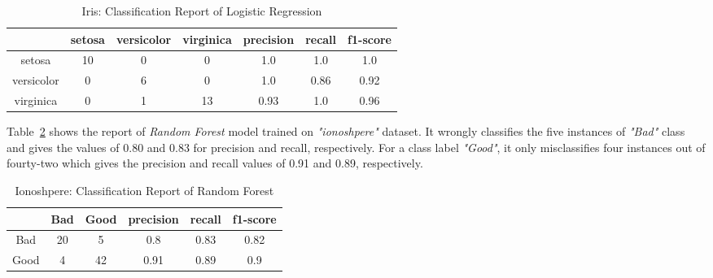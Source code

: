 \documentclass[english]{tktltiki2}
\theoremstyle{definition}
\theoremstyle{remark}
\begin{document}
\begin{table}[H]
	\centering
	\caption{Iris: Classification Report of Logistic Regression}
	\label{table:lr_model_iris_report}
	\begin{tabular}{@{}ccccccc@{}}
		\toprule
		& setosa & versicolor & virginica & precision & recall & f1-score \\ \hline
		
		\multicolumn{1}{|c|}{setosa} & \multicolumn{1}{c|}{10} & \multicolumn{1}{c|}{0} & \multicolumn{1}{c|}{0} & \multicolumn{1}{c|}{1.0} & \multicolumn{1}{c|}{1.0} & \multicolumn{1}{c|}{1.0} \\ \hline
		
		\multicolumn{1}{|c|}{versicolor} & \multicolumn{1}{c|}{0} & \multicolumn{1}{c|}{6} & \multicolumn{1}{c|}{0} & \multicolumn{1}{c|}{1.0} & \multicolumn{1}{c|}{0.86} & \multicolumn{1}{c|}{0.92} \\ \hline
		
		\multicolumn{1}{|c|}{virginica} & \multicolumn{1}{c|}{0} & \multicolumn{1}{c|}{1} & \multicolumn{1}{c|}{13} & \multicolumn{1}{c|}{0.93} & \multicolumn{1}{c|}{1.0} & \multicolumn{1}{c|}{0.96} \\ \hline
	\end{tabular}
\end{table}


Table~\ref{table:rf_model_iono_report} shows the report of \textit{Random Forest} model trained on \textit{"ionoshpere"} dataset. It wrongly classifies the five instances of \textit{"Bad"} class and gives the values of 0.80 and 0.83 for precision and recall, respectively. For a class label \textit{"Good"}, it only misclassifies four instances out of fourty-two which gives the precision and recall values of 0.91 and 0.89, respectively.

\begin{table}[H]
	\begin{center}
		\caption{Ionoshpere: Classification Report of Random Forest}
		\label{table:rf_model_iono_report}
		\begin{tabular}{@{}cccccc@{}}
			\toprule
			& Bad & Good & precision & recall & f1-score \\ \hline
			\multicolumn{1}{|c|}{Bad} & \multicolumn{1}{c|}{20} & \multicolumn{1}{c|}{5} & \multicolumn{1}{c|}{0.8} & \multicolumn{1}{c|}{0.83} & \multicolumn{1}{c|}{0.82} \\ \hline
			\multicolumn{1}{|c|}{Good} & \multicolumn{1}{c|}{4} & \multicolumn{1}{c|}{42} & \multicolumn{1}{c|}{0.91} & \multicolumn{1}{c|}{0.89} & \multicolumn{1}{c|}{0.9} \\ \hline
		\end{tabular}
	\end{center}
\end{table}
\end{document}
